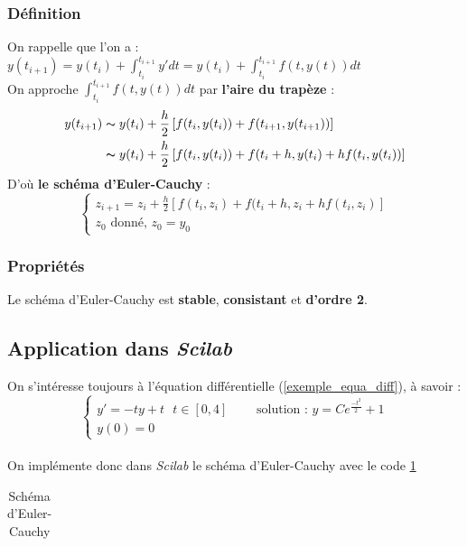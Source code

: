 \documentclass[a4paper,10pt]{report}
\begin{document}
\subsubsection{Définition}
On rappelle que l'on a : $y(t_{i+1}) = y(t_i) + \int_{t_i}^{t_{i+1}} y'dt = y(t_i) + \int_{t_i}^{t_{i+1}} f(t,y(t))dt$\\
On approche $\int_{t_i}^{t_{i+1}} f(t,y(t))dt$ par \textbf{l'aire du trapèze} :\\
\abovedisplayskip=0mm
\begin{align*}
   y(t_{i+1}) & \thicksim y(t_i)+\frac{h}{2} \left[ f(t_i,y(t_i)) + f(t_{i+1},y(t_{i+1})) \right] \\
			  & \thicksim y(t_i)+\frac{h}{2} \left[ f(t_i,y(t_i)) + f(t_i+h,y(t_i)+hf(t_i,y(t_i)) \right]
\end{align*}
D'où \textbf{le schéma d'Euler-Cauchy} :\\
\begin{equation}
\left\lbrace
\begin{array}{l}
z_{i+1}=z_i+\frac{h}{2} \left[ f(t_i,z_i) + f(t_i+h,z_i+hf(t_i,z_i) \right] \\
z_0 \text{ donné, } z_0=y_0
\end{array}\right.
\end{equation}

\subsubsection{Propriétés}
Le schéma d'Euler-Cauchy est \textbf{stable}, \textbf{consistant} et \textbf{d'ordre 2}.

\subsection{Application dans \textit{Scilab}}
On s'intéresse toujours à l'équation différentielle (\ref{exemple_equa_diff}), à savoir :\\
\begin{equation*}
\left\lbrace
\begin{array}{lll}
y'=-ty+t \ \ \ t \in [0,4] & \text{    } & \text{solution : }y=Ce^{\frac{-t^2}{2}}+1 \\
y(0)=0
\end{array}\right.
\end{equation*} \\

On implémente donc dans \textit{Scilab} le schéma d'Euler-Cauchy avec le code \ref{code_eulercauchy}
\begin{table}[H]
\caption{Schéma d'Euler-Cauchy}
\begin{tabular}{l}

\label{code_eulercauchy}
\end{tabular}
\end{table}
\end{document}
